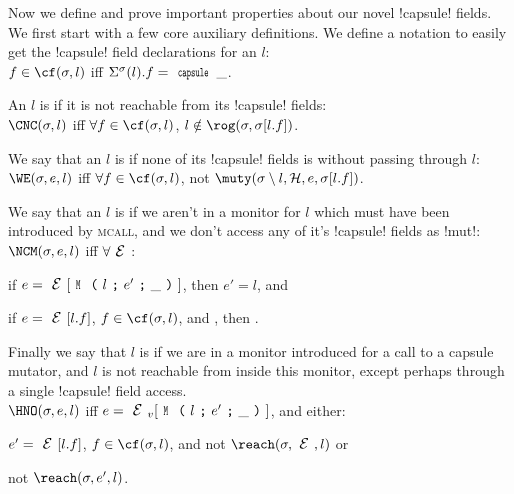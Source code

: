 



Now we define and prove important properties about our novel \Q!capsule! fields. We first start with a few core auxiliary definitions. We define a notation to easily get the \Q!capsule! field declarations for an $l$:\\
\indent $f \in \cf(\s, l)$ iff $\Ss(l).f = \Kw{capsule}\,\_$.

\noindent An $l$ is \CNC if it is not reachable from its \Q!capsule! fields:\\
\indent $\CNC(\s, l)$ iff $\forall f \in \cf(\s, l)$, $l \notin \rog(\s, \s[l.f])$.

\noindent We say that an $l$ is \WE if none of its \Q!capsule! fields is \muty without passing through $l$:\\
\indent $\WE(\s, e, l)$ iff $\forall f \in \cf(\s, l)$, not $\muty(\s\setminus l, \h, e, \s[l.f])$.

\noindent We say that an $l$ is \NCM if we aren't in a monitor for $l$ which must have been introduced by \textsc{mcall}, and we don't access any of it's \Q!capsule! fields as \Q!mut!:\\
\indent $\NCM(\s, e, l)$ iff $\forall \E$:
\begin{iitemize}
\item if $e = \E[\M{l}{e'}{\_}]$, then $e' = l$, and
\item if $e = \E[l.f]$, $f \in \cf(\s, l)$, and , then .
\end{iitemize}

\noindent Finally we say that $l$ is \HNO if we are in a monitor introduced for a call to a capsule mutator, and $l$ is not reachable from inside this monitor, except perhaps through a single \Q!capsule! field access.\\
\indent $\HNO(\s, e, l)$ iff $e = \EV[\M{l}{e'}{\_}]$, and either:
\begin{iitemize}
\item $e' = \E[l.f]$, $f \in \cf(\s, l)$, and not $\reach(\s, \E, l)$ or
\item not $\reach(\s, e', l)$.
\end{iitemize}

